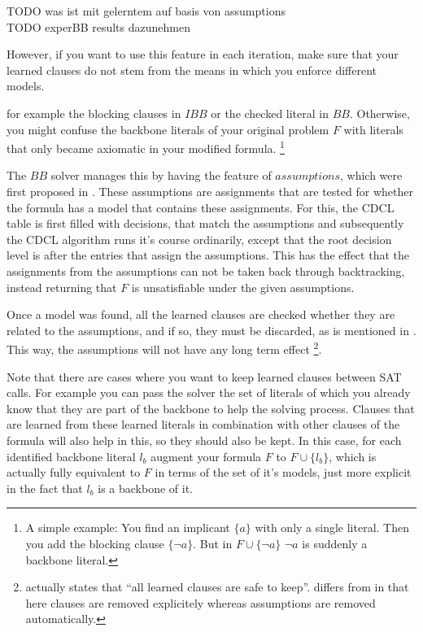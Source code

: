TODO was ist mit gelerntem auf basis von assumptions
\\TODO experBB results dazunehmen

\iffalse

However, if you want to use this feature in each iteration, make sure that your learned clauses do not stem from the means in which you enforce different models.

 for example the blocking clauses in $IBB$ or the checked literal in $BB$. Otherwise, you might confuse the backbone literals of your original problem $F$ with literals that only became axiomatic in your modified formula. \footnote{A simple example: You find an implicant $\{a\}$ with only a single literal. Then you add the blocking clause $\{\neg a\}$. But in $F \cup \{\neg a\}$ $\neg a$ is suddenly a backbone literal.}

The $BB$ solver manages this by having the feature of $assumptions$, which were first proposed in \cite{ENSO03}. These assumptions are assignments that are tested for whether the formula has a model that contains these assignments. For this, the CDCL table is first filled with decisions, that match the assumptions and subsequently the CDCL algorithm runs it's course ordinarily, except that the root decision level is after the entries that assign the assumptions. This has the effect that the assignments from the assumptions can not be taken back through backtracking, instead returning that $F$ is unsatisfiable under the given assumptions.

Once a model was found, all the learned clauses are checked whether they are related to the assumptions, and if so, they must be discarded, as is mentioned in \cite{WKS01}. This way, the assumptions will not have any long term effect
\footnote{\cite{ENSO03} actually states that ``all learned clauses are safe to keep''. \cite{WKS01} differs from \cite{ENSO03} in that here clauses are removed explicitely whereas assumptions are removed automatically.}.


Note that there are cases where you want to keep learned clauses between SAT calls. For example you can pass the solver the set of literals of which you already know that they are part of the backbone to help the solving process. Clauses that are learned from these learned literals in combination with other clauses of the formula will also help in this, so they should also be kept. In this case, for each identified backbone literal $l_b$ augment your formula $F$ to $F \cup \{l_b\}$, which is actually fully equivalent to $F$ in terms of the set of it's models, just more explicit in the fact that $l_b$ is a backbone of it.


